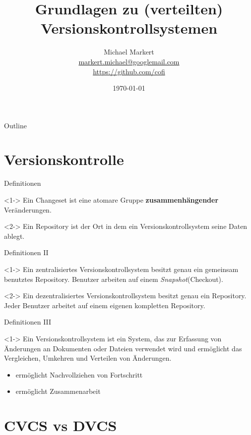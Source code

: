 \documentclass[presentation]{beamer}
\title{Grundlagen zu (verteilten) Versionskontrollsystemen}
\author[Michael Markert]{Michael Markert\\
  \href{mailto:markert.michael@googlemail.com}{markert.michael@googlemail.com}\\
  \url{https://github.com/cofi}}
\date{\today}
\begin{document}
\begin{frame}[plain]
  \titlepage
\end{frame}

\begin{frame}{Outline}
  \setcounter{tocdepth}{1}
  \tableofcontents
\end{frame}
\section{Versionskontrolle}
\begin{frame}{Definitionen}
  \begin{definition}<1->
    Ein \alert{Changeset} ist eine atomare Gruppe \textbf{zusammenhängender}
    Veränderungen.
  \end{definition}
  \begin{definition}<2->
    Ein \alert{Repository} ist der Ort in dem ein Versionskontrollsystem seine
    Daten ablegt.
  \end{definition}
\end{frame}
\begin{frame}{Definitionen II}
  \begin{definition}<1->
    Ein \alert{zentralisiertes Versionskontrollsystem} besitzt genau ein
    gemeinsam benutztes Repository. Benutzer arbeiten auf einem
    \emph{Snapshot}(Checkout).
  \end{definition}
  \begin{definition}<2->
    Ein \alert{dezentralisiertes Versionskontrollsystem} besitzt genau ein
    Repository. Jeder Benutzer arbeitet auf einem eigenen kompletten Repository.
  \end{definition}
\end{frame}
\begin{frame}{Definitionen III}
  \begin{definition}<1->
    Ein \alert{Versionskontrollsystem} ist ein System, das zur Erfassung von
    Änderungen an Dokumenten oder Dateien verwendet wird und ermöglicht das
    Vergleichen, Umkehren und Verteilen von Änderungen.
  \end{definition}
  \begin{itemize}
  \item<2-> ermöglicht Nachvollziehen von Fortschritt
  \item<3-> ermöglicht Zusammenarbeit
  \end{itemize}
\end{frame}
\section{CVCS vs DVCS}
\end{document}
